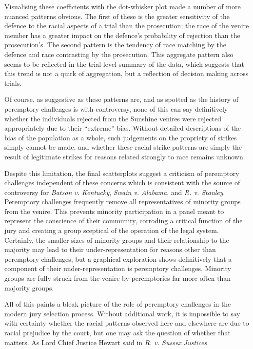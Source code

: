 Visualising these coefficients with the dot-whisker plot made a number of more nuanced patterns obvious. The first of these is the greater sensitivity of the defence to the racial aspects of a trial than the
prosecution; the race of the venire member has a greater impact on the defence's probability of rejection than the
prosecution's. The second pattern is the tendency of race matching by
the defence and race contrasting by the prosecution. This aggregate pattern also seems to be reflected in the trial level
summary of the data, which suggests that this trend is not a quirk of
aggregation, but a reflection of decision making across trials.

Of course, as suggestive as these patterns are, and as spotted as the history of peremptory challenges is with controversy, none
of this can say definitively whether the individuals rejected from the
Sunshine venires were rejected appropriately due to their ``extreme''
bias. Without detailed descriptions of the bias of the population as a whole, such judgements on the propriety of strikes simply
cannot be made, and whether these racial strike patterns are simply the result of legitimate strikes for reasons related
strongly to race remains unknown.

Despite this limitation, the final scatterplots suggest a criticism of
peremptory challenges independent of these concerns which is consistent with the source
of controversy for \textit{Batson v. Kentucky}, \textit{Swain v. Alabama}, and \textit{R. v. Stanley}. Peremptory challenges
frequently remove all representatives of minority groups from the
venire. This prevents minority participation in a panel meant to
represent the conscience of their community, corroding a critical function of the jury and creating a group
sceptical of the operation of the legal system. Certainly, the smaller sizes of minority groups and their relationship to the
majority may lead to their under-representation for reasons other than peremptory challenges, but a graphical exploration shows
definitively that a component of their under-representation is
peremptory challenges. Minority groups are fully struck from the
venire by peremptories far more often than majority groups.

All of this paints a bleak picture of the role of peremptory challenges in the modern jury selection process. Without additional
work, it is impossible to say with certainty whether the racial patterns observed here and elsewhere are due to racial prejudice
by the court, but one may ask the question of whether that matters. As Lord Chief Justice Hewart said in \textit{R. v. Sussex
  Justices}

